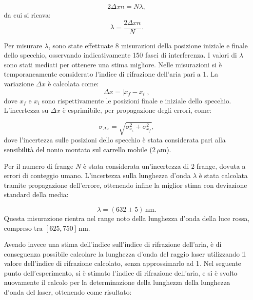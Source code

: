 \documentclass[a4paper,12pt]{article}
\begin{document}
\begin{equation}
2\Delta x n = N\lambda,
\label{eq:frange_interferenza}
\end{equation}
da cui si ricava:
\begin{equation}
\lambda = \frac{2\Delta x n}{N}.
\label{eq:calcolo_lambda}
\end{equation}

Per misurare \( \lambda \), sono state effettuate 8 misurazioni della posizione iniziale e finale dello specchio, osservando indicativamente 150 fasci di interferenza. I valori di \( \lambda \) sono stati mediati per ottenere una stima migliore. Nelle misurazioni si è temporaneamente considerato l’indice di rifrazione dell’aria pari a 1.
La variazione \( \Delta x \) è calcolata come:
\begin{equation}
\Delta x = |x_f - x_i|,
\end{equation}
dove \( x_f \) e \( x_i \) sono rispettivamente le posizioni finale e iniziale dello specchio. L’incertezza su \( \Delta x \) è esprimibile, per propagazione degli errori, come:

\begin{equation}
\sigma_{\Delta x} = \sqrt{\sigma_{x_i}^2 + \sigma_{x_f}^2},
\label{eq:incertezza_delta_x}
\end{equation}
dove l’incertezza sulle posizioni dello specchio è stata considerata pari alla sensibilità del nonio montato sul carrello mobile (\( 2 \, \mu\text{m} \)).

Per il numero di frange \( N \) è stata considerata un’incertezza di 2 frange, dovuta a errori di conteggio umano. L’incertezza sulla lunghezza d’onda \( \lambda \) è stata calcolata tramite propagazione dell’errore, ottenendo infine la miglior stima con deviazione standard della media:

\begin{equation}
\lambda = (632 \pm 5) \, \text{nm}.
\label{eq:valore_lambda}
\end{equation}
Questa misurazione rientra nel range noto della lunghezza d’onda della luce rossa, compreso tra \( [625, 750] \, \text{nm} \).

Avendo invece una stima dell’indice sull’indice di rifrazione dell’aria, è di conseguenza possibile calcolare la lunghezza d’onda del raggio laser utilizzando il valore dell’indice di rifrazione calcolato, senza approssimarlo ad 
1. 
Nel seguente punto dell’esperimento, si è stimato l’indice di rifrazione dell’aria, e si è svolto nuovamente il calcolo per la determinazione della lunghezza della lunghezza d’onda del laser, ottenendo come risultato: 
\end{document}

